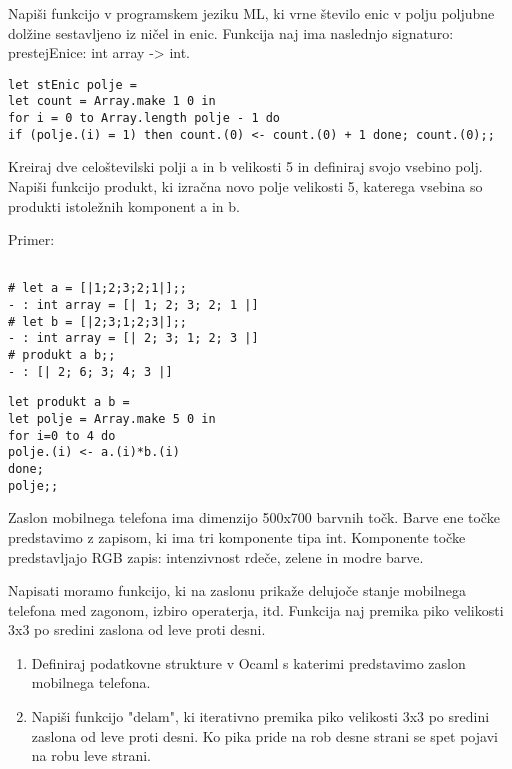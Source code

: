 \begin{ex}
Napi\v si funkcijo v programskem jeziku ML, ki vrne \v stevilo enic v polju poljubne dol\v zine sestavljeno iz ni\v cel in enic. Funkcija naj ima naslednjo signaturo: prestejEnice: int array -> int.

\begin{sol}
\begin{lstlisting}
let stEnic polje = 
let count = Array.make 1 0 in
for i = 0 to Array.length polje - 1 do 
if (polje.(i) = 1) then count.(0) <- count.(0) + 1 done; count.(0);;
\end{lstlisting}
\end{sol}

\end{ex}
\begin{ex}
Kreiraj dve celo\v stevilski polji a in b velikosti 5 in definiraj svojo vsebino polj. Napi\v si funkcijo produkt, ki izra\v cna novo polje velikosti 5, katerega vsebina so produkti istole\v znih komponent a in b.

Primer: \begin{lstlisting}

# let a = [|1;2;3;2;1|];;
- : int array = [| 1; 2; 3; 2; 1 |]
# let b = [|2;3;1;2;3|];;
- : int array = [| 2; 3; 1; 2; 3 |]
# produkt a b;; 
- : [| 2; 6; 3; 4; 3 |]
\end{lstlisting}

\begin{sol}
\begin{lstlisting}
let produkt a b = 
let polje = Array.make 5 0 in
for i=0 to 4 do
polje.(i) <- a.(i)*b.(i)
done;
polje;;
\end{lstlisting}
\end{sol}


\end{ex}
\begin{ex}
Zaslon mobilnega telefona ima dimenzijo 500x700 barvnih to\v ck. Barve ene to\v cke predstavimo z zapisom, ki ima tri komponente tipa int. Komponente to\v cke predstavljajo RGB zapis: intenzivnost rde\v ce, zelene in modre barve. 

Napisati moramo funkcijo, ki na zaslonu prika\v ze delujo\v ce stanje mobilnega telefona med zagonom, izbiro operaterja, itd. Funkcija naj premika piko velikosti 3x3 po sredini zaslona od leve proti desni. 

\begin{enumerate}
\item  Definiraj podatkovne strukture v Ocaml s katerimi predstavimo zaslon mobilnega telefona.
\item  Napi\v si funkcijo "delam", ki iterativno premika piko velikosti 3x3 po sredini zaslona od leve proti desni. Ko pika pride na rob desne strani se spet pojavi na robu leve strani.
\end{enumerate}

\end{ex}
